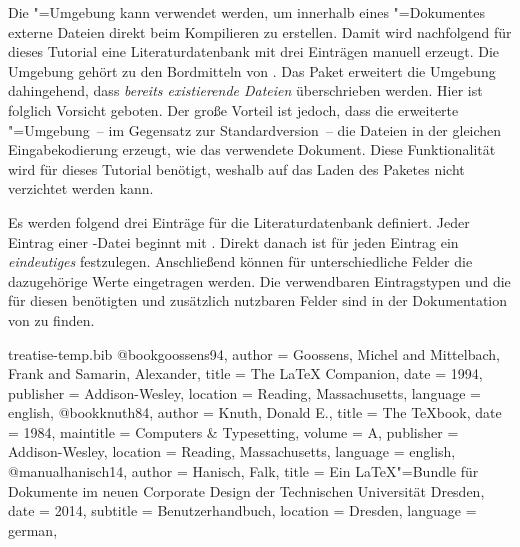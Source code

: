 \documentclass[%
  english,ngerman,%
  geometry=no,DIV=12,automark,%
]{tudscrartcl}
\begin{document}
Die "=Umgebung kann verwendet werden, um innerhalb 
eines "=Dokumentes externe Dateien direkt beim Kompilieren zu
erstellen. Damit wird nachfolgend für dieses Tutorial eine Literaturdatenbank 
 mit drei Einträgen manuell erzeugt. Die Umgebung 
gehört zu den Bordmitteln von . Das Paket  
erweitert die Umgebung dahingehend, dass \emph{bereits existierende Dateien} 
überschrieben werden. Hier ist folglich Vorsicht geboten. Der große Vorteil ist 
jedoch, dass die erweiterte "=Umgebung~-- im 
Gegensatz zur Standardversion~-- die Dateien in der gleichen Eingabekodierung 
erzeugt, wie das verwendete Dokument. Diese Funktionalität wird für dieses 
Tutorial benötigt, weshalb auf das Laden des Paketes  
nicht verzichtet werden kann. 
%
\begin{Preamble}
\usepackage{filecontents}
\end{Preamble}
%
Es werden folgend drei Einträge für die Literaturdatenbank definiert. Jeder 
Eintrag einer -Datei beginnt mit . 
Direkt danach ist für jeden Eintrag ein \emph{eindeutiges}  
festzulegen. Anschließend können für unterschiedliche Felder die dazugehörige 
Werte eingetragen werden. Die verwendbaren Eintragstypen und die für diesen 
benötigten und zusätzlich nutzbaren Felder sind in der Dokumentation von 
 zu finden.
%
\begin{Preamble*}
\begin{filecontents}{treatise-temp.bib}
@book{goossens94,
  author    = {Goossens, Michel and Mittelbach, Frank
               and Samarin, Alexander},
  title     = {The LaTeX Companion},
  date      = {1994},
  publisher = {Addison-Wesley},
  location  = {Reading, Massachusetts},
  language  = {english},
}
@book{knuth84,
  author    = {Knuth, Donald E.},
  title     = {The \TeX book},
  date      = {1984},
  maintitle = {Computers \& Typesetting},
  volume    = {A},
  publisher = {Addison-Wesley},
  location  = {Reading, Massachusetts},
  language  = {english},
}
@manual{hanisch14,
  author    = {Hanisch, Falk},
  title     = {Ein \LaTeX"=Bundle für Dokumente
               im neuen Corporate Design 
               der Technischen Universität Dresden},
  date      = {2014},
  subtitle  = {Benutzerhandbuch},
  location  = {Dresden},
  language  = {german},
}
\end{filecontents}
\end{Preamble*}
\end{document}
